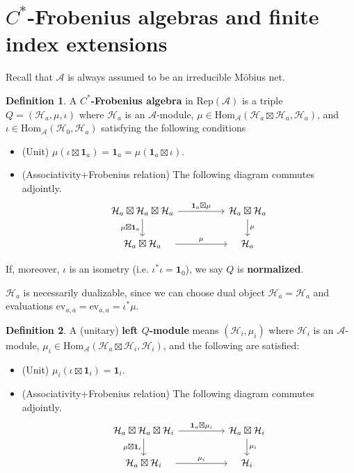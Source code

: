 \documentclass[11pt,b5paper,notitlepage]{article}
\theoremstyle{definition}
\newtheorem{df}{Definition}[section]
\theoremstyle{plain}
\newcommand{\mc}{\mathcal}
\newcommand{\ovl}{\overline}
\newcommand{\id}{\mathbf{1}}
\newcommand{\Hom}{\mathrm{Hom}}
\newcommand{\ev}{\mathrm{ev}}
\newcommand{\RepA}{\mathrm{Rep}(\mathcal A)}
\numberwithin{equation}{section}
\begin{document}
	
\section{$C^*$-Frobenius algebras and finite index extensions}	


Recall that  $\mc A$ is always assumed to be an irreducible M\"obius net.

\begin{df}
	A \textbf{$C^*$-Frobenius algebra} in $\RepA$ is a triple $Q=(\mc H_a,\mu,\iota)$ where $\mc H_a$ is an $\mc A$-module, $\mu\in\Hom_{\mc A}(\mc H_a\boxtimes\mc H_a,\mc H_a)$, and $\iota\in\Hom_{\mc A}(\mc H_0,\mc H_a)$  satisfying the following conditions
	\begin{itemize}
		\item (Unit) $\mu(\iota\boxtimes\id_a)=\id_a=\mu(\id_a\boxtimes\iota)$.
		\item (Associativity+Frobenius relation) The following diagram commutes adjointly.
		\begin{equation}
			\begin{tikzcd}
				\mc H_a\boxtimes\mc H_a\boxtimes \mc H_a\arrow[rr,"\id_a\boxtimes\mu"]\arrow[d,"\mu\boxtimes\id_a"'] && \mc H_a\boxtimes\mc H_a\arrow[d,"\mu"]\\
				\quad\mc H_a\boxtimes\mc H_a\quad\arrow[rr,"\mu"] && \quad\mc H_a\quad
			\end{tikzcd}	
		\end{equation} 
	\end{itemize}
	If, moreover, $\iota$ is an isometry (i.e. $\iota^*\iota=\id_0$), we say $Q$ is \textbf{normalized}.
\end{df}


$\mc H_a$ is necessarily dualizable, since we can choose dual object $\mc H_{\ovl a}=\mc H_a$ and evaluations $\ev_{a,\ovl a}=\ev_{\ovl a,a}=\iota^*\mu$.


\begin{df}
	A (unitary) \textbf{left $Q$-module} means $(\mc H_i,\mu_i)$ where $\mc H_i$ is an $\mc A$-module, $\mu_i\in\Hom_{\mc A}(\mc H_a\boxtimes\mc H_i,\mc H_i)$, and the following are satisfied:	
	\begin{itemize}
		\item (Unit) $\mu_i(\iota\boxtimes\id_i)=\id_i$.
		\item (Associativity+Frobenius relation) The following diagram commutes adjointly.
		\begin{equation}\label{eq3}
			\begin{tikzcd}
				\mc H_a\boxtimes\mc H_a\boxtimes \mc H_i\arrow[rr,"\id_a\boxtimes\mu_i"]\arrow[d,"\mu\boxtimes\id_i"'] && \mc H_a\boxtimes\mc H_i\arrow[d,"\mu_i"]\\
				\quad\mc H_a\boxtimes\mc H_i\quad\arrow[rr,"\mu_i"] && \quad\mc H_i\quad
			\end{tikzcd}	
		\end{equation} 
	\end{itemize}	
\end{df}	
\end{document}
